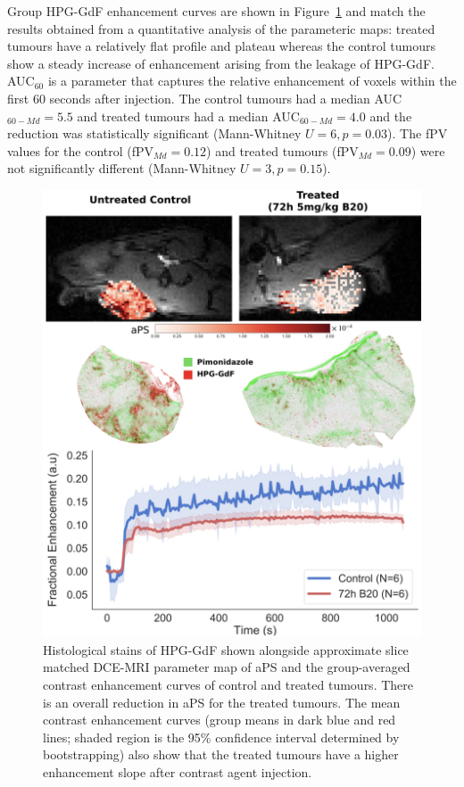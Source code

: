Group \acs{HPG-GdF} enhancement curves are shown in Figure~\ref{hpg:aPShistoEC} and match the results obtained from a quantitative analysis of the parameteric maps: treated tumours have a relatively flat profile and plateau whereas the control tumours show a steady increase of enhancement arising from the leakage of \acs{HPG-GdF}.
\acs{AUC}$_{60}$ is a parameter that captures the relative enhancement of voxels within the first 60 seconds after injection.
The control tumours had a median \acs{AUC}$_{60-Md} = 5.5$ and treated tumours had a median \acs{AUC}$_{60-Md} = 4.0$ and the reduction was statistically significant (Mann-Whitney $U = 6, p = 0.03$).
The \acs{fPV} values for the control (fPV$_{Md} = 0.12$) and treated tumours (fPV$_{Md} = 0.09$) were not significantly different (Mann-Whitney $U = 3, p = 0.15$).

\begin{figure}[htbp] %
  \centering
  \includegraphics[width=\textwidth]{hpg/hpg-B20-images/hpg_aPShisto_ec.png} 
  \captionsetup{width=\linewidth}
  \caption{Histological stains of \acs{HPG-GdF} shown alongside approximate slice matched \acs{DCE-MRI} parameter map of \acs{aPS} and the group-averaged contrast enhancement curves of control and treated tumours. There is an overall reduction in \acs{aPS} for the treated tumours. The mean contrast enhancement curves (group means in dark blue and red lines; shaded region is the 95\% confidence interval determined by bootstrapping) also show that the treated tumours have a higher enhancement slope after contrast agent injection.}
  \label{hpg:aPShistoEC}
\end{figure}

